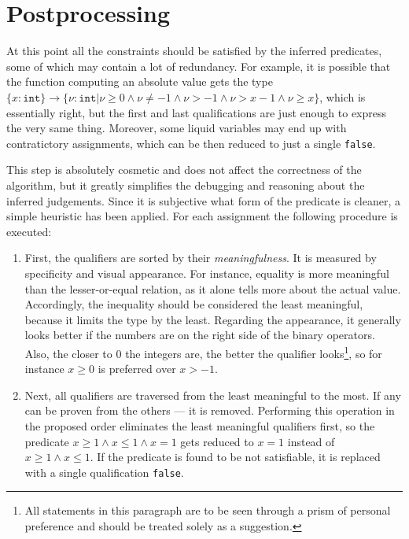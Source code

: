 \section{Postprocessing}

At this point all the constraints should be satisfied by the inferred
predicates, some of which may contain a lot of redundancy. For example, it is
possible that the function computing an absolute value gets the type $\{x :
\texttt{int}\} \to \{\nu : \texttt{int} | \nu \geq 0 \land \nu \neq -1 \land \nu
> -1 \land \nu > x - 1 \land \nu \geq x\}$, which is essentially right, but the
first and last qualifications are just enough to express the very same thing.
Moreover, some liquid variables may end up with contratictory assignments, which
can be then reduced to just a single \texttt{false}.

This step is absolutely cosmetic and does not affect the correctness of the
algorithm, but it greatly simplifies the debugging and reasoning about the
inferred judgements. Since it is subjective what form of the predicate is
cleaner, a simple heuristic has been applied. For each assignment the following
procedure is executed:

\begin{enumerate}
\item First, the qualifiers are sorted by their \emph{meaningfulness}. It is
  measured by specificity and visual appearance. For instance, equality is more
  meaningful than the lesser-or-equal relation, as it alone tells more about the
  actual value. Accordingly, the inequality should be considered the least
  meaningful, because it limits the type by the least. Regarding the appearance,
  it generally looks better if the numbers are on the right side of the binary
  operators. Also, the closer to 0 the integers are, the better the qualifier
  looks\footnote{All statements in this paragraph are to be seen through a prism
    of personal preference and should be treated solely as a suggestion.}, so
  for instance $x \geq 0$ is preferred over $x > -1$.

\item Next, all qualifiers are traversed from the least meaningful to the most.
  If any can be proven from the others --- it is removed. Performing this
  operation in the proposed order eliminates the least meaningful qualifiers
  first, so the predicate $x \geq 1 \land x \leq 1 \land x = 1$ gets reduced to
  $x = 1$ instead of $x \geq 1 \land x \leq 1$. If the predicate is found to be
  not satisfiable, it is replaced with a single qualification \texttt{false}.
\end{enumerate}
